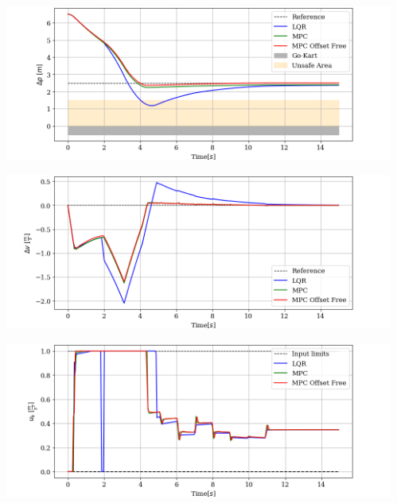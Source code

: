 \documentclass[9pt, aspectratio=169]{beamer}
\begin{document}
\begin{frame}
\begin{columns}
\begin{column}{0.57\textwidth}
\end{column}
\begin{column}{0.43\textwidth}
	\begin{center}
  		\includegraphics[width=1\textwidth]{Ta_Lou/Deltap} 
	\end{center}
	\vspace{-0.4cm}
	\begin{center}
  		\includegraphics[width=1\textwidth]{Ta_Lou/Deltav} 
	\end{center}
	\vspace{-0.4cm}
	\begin{center}
  		\includegraphics[width=1\textwidth]{Ta_Lou/Input} 
	\end{center}
\end{column}
\end{columns}
\end{frame}


\end{document}
